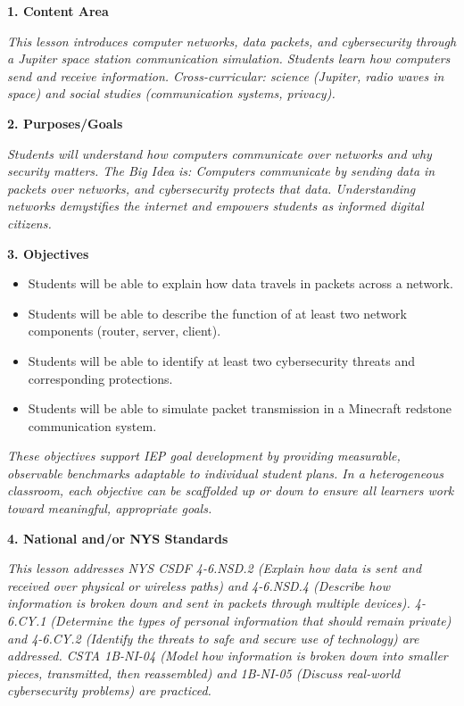 \documentclass[11pt,letterpaper]{article}
\begin{document}
\textbf{1. Content Area}

\textit{This lesson introduces computer networks, data packets, and cybersecurity through a Jupiter space station communication simulation. Students learn how computers send and receive information. Cross-curricular: science (Jupiter, radio waves in space) and social studies (communication systems, privacy).}

\textbf{2. Purposes/Goals}

\textit{Students will understand how computers communicate over networks and why security matters. The Big Idea is: Computers communicate by sending data in packets over networks, and cybersecurity protects that data. Understanding networks demystifies the internet and empowers students as informed digital citizens.}

\textbf{3. Objectives}

\begin{itemize}
  \item Students will be able to explain how data travels in packets across a network.

  \item Students will be able to describe the function of at least two network components (router, server, client).

  \item Students will be able to identify at least two cybersecurity threats and corresponding protections.

  \item Students will be able to simulate packet transmission in a Minecraft redstone communication system.
\end{itemize}

\textit{These objectives support IEP goal development by providing measurable, observable benchmarks adaptable to individual student plans. In a heterogeneous classroom, each objective can be scaffolded up or down to ensure all learners work toward meaningful, appropriate goals.}

\textbf{4. National and/or NYS Standards}

\textit{This lesson addresses NYS CSDF 4-6.NSD.2 (Explain how data is sent and received over physical or wireless paths) and 4-6.NSD.4 (Describe how information is broken down and sent in packets through multiple devices). 4-6.CY.1 (Determine the types of personal information that should remain private) and 4-6.CY.2 (Identify the threats to safe and secure use of technology) are addressed. CSTA 1B-NI-04 (Model how information is broken down into smaller pieces, transmitted, then reassembled) and 1B-NI-05 (Discuss real-world cybersecurity problems) are practiced.}
\end{document}
